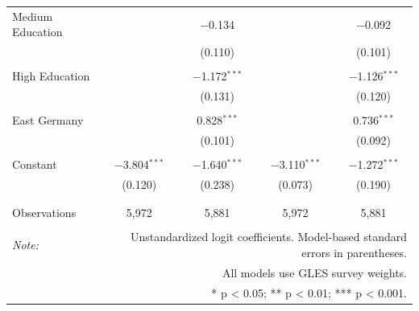 \begin{table}[!htbp]
\begin{tabular}{@{\extracolsep{5pt}}lcccc}
 Medium Education &  & $-$0.134 &  & $-$0.092 \\ 
  &  & (0.110) &  & (0.101) \\ 
  & & & & \\ 
 High Education &  & $-$1.172$^{***}$ &  & $-$1.126$^{***}$ \\ 
  &  & (0.131) &  & (0.120) \\ 
  & & & & \\ 
 East Germany &  & 0.828$^{***}$ &  & 0.736$^{***}$ \\ 
  &  & (0.101) &  & (0.092) \\ 
  & & & & \\ 
 Constant & $-$3.804$^{***}$ & $-$1.640$^{***}$ & $-$3.110$^{***}$ & $-$1.272$^{***}$ \\ 
  & (0.120) & (0.238) & (0.073) & (0.190) \\ 
  & & & & \\ 
\hline \\[-1.8ex] 
Observations & 5,972 & 5,881 & 5,972 & 5,881 \\ 
\hline 
\hline \\[-1.8ex] 
\textit{Note:}  & \multicolumn{4}{r}{Unstandardized logit coefficients. Model-based standard errors in parentheses.} \\ 
 & \multicolumn{4}{r}{All models use GLES survey weights.} \\ 
 & \multicolumn{4}{r}{* p < 0.05; ** p < 0.01; *** p < 0.001.} \\ 
\end{tabular} 
\end{table} 
